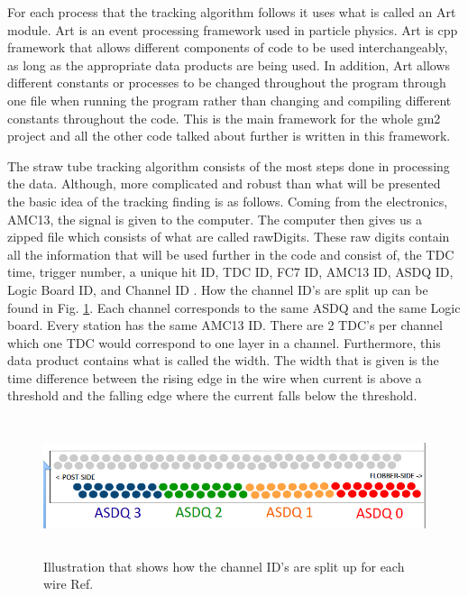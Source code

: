 \documentclass[./Thesis]{subfiles}
\begin{document}


	For each process that the tracking algorithm follows it uses what is called an Art module. Art is an event processing framework used in particle physics. Art is cpp framework that allows different components of code to be used interchangeably, as long as the appropriate data products are being used. In addition, Art allows different constants or processes to be changed throughout the program through one file when running the program rather than changing and compiling different constants throughout the code. This is the main framework for the whole gm2 project and all the other code talked about further is written in this framework.

	The straw tube tracking algorithm consists of the most steps done in processing the data. Although, more complicated and robust than what will be presented the basic idea of the tracking finding is as follows. Coming from the electronics, AMC13, the signal is given to the computer. The computer then gives us a zipped file which consists of what are called rawDigits. These raw digits contain all the information that will be used further in the code and consist of, the TDC time, trigger number, a unique hit ID, TDC ID, FC7 ID, AMC13 ID, ASDQ ID, Logic Board ID, and Channel ID . How the channel ID's are split up can be found in Fig. \ref{fig:channelID}. Each channel corresponds to the same ASDQ and the same Logic board. Every station has the same AMC13 ID. There are 2 TDC's per channel which one TDC would correspond to one layer in a channel. Furthermore, this data product contains what is called the width. The width that is given is the time difference between the rising edge in the wire when current is above a threshold and the falling edge where the current falls below the threshold. 
	
\begin{figure}
	\centerline{\includegraphics[height=40mm]{ADCSplitUp.png}}
	\caption[Top View of Tracker Electronics]{ Illustration that shows how the channel ID's are split up for each wire  Ref. \cite{jPrice}
	}
	\label{fig:channelID}
\end{figure} 
\end{document}
